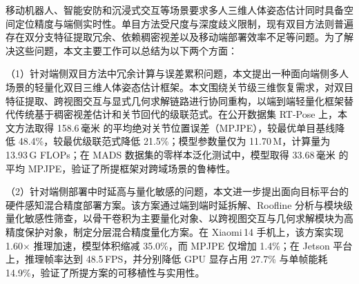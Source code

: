 
\begin{abstractcn}\setlength{\baselineskip}{20pt}%
  
移动机器人、智能安防和沉浸式交互等场景要求多人三维人体姿态估计同时具备空间定位精度与端侧实时性。单目方法受尺度与深度歧义限制，现有双目方法则普遍存在双分支特征提取冗余、依赖稠密视差以及移动端部署效率不足等问题。为了解决这些问题，本文主要工作可以总结为以下两个方面：

  （1）针对端侧双目方法中冗余计算与误差累积问题，本文提出一种面向端侧多人场景的轻量化双目三维人体姿态估计框架。本文围绕关节级三维恢复需求，对双目特征提取、跨视图交互与显式几何求解链路进行协同重构，以端到端轻量化框架替代传统基于稠密视差估计和关节回代的级联范式。在公开数据集 RT-Pose 上，本文方法取得 158.6\,毫米 的平均绝对关节位置误差（MPJPE），较最优单目基线降低 48.4\%，较最优级联范式降低 21.5\%；模型参数量仅为 11.70\,M，计算量为 13.93\,G FLOPs；在 MADS 数据集的零样本泛化测试中，模型取得 33.68\,毫米 的平均 MPJPE，验证了所提框架对跨域场景的鲁棒性。

  （2）针对端侧部署中时延高与量化敏感的问题，本文进一步提出面向目标平台的硬件感知混合精度部署方案。该方案通过端到端时延拆解、Roofline 分析与模块级量化敏感性筛查，以骨干卷积为主要量化对象、以跨视图交互与几何求解模块为高精度保护对象，制定分层混合精度量化方案。在 Xiaomi\,14 手机上，该方案实现 1.60$\times$ 推理加速，模型体积缩减 35.0\%，而 MPJPE 仅增加 1.4\%；在 Jetson 平台上，推理帧率达到 48.5\,FPS，并分别降低 GPU 显存占用 27.7\% 与单帧能耗 14.9\%，验证了所提方案的可移植性与实用性。


\end{abstractcn}
